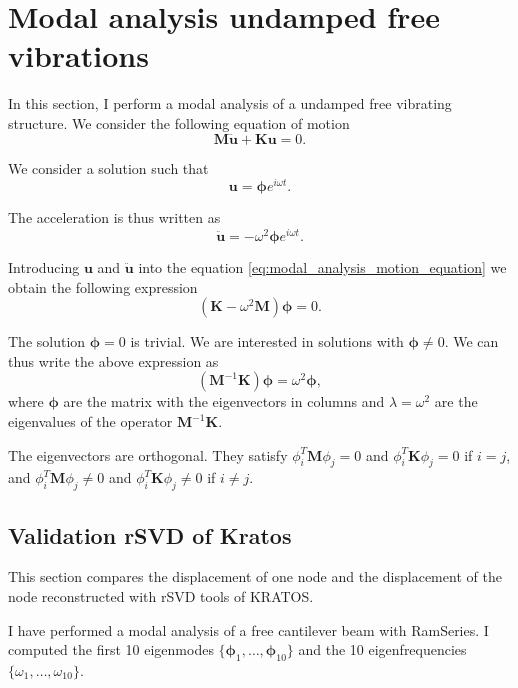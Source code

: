 \documentclass{article}
\begin{document}
\section{Modal analysis undamped free vibrations}
In this section, I perform a modal analysis of a undamped free vibrating structure. We consider the following equation of motion
\begin{equation}
  \bm{M}\bm{\ddot{u}} + \bm{K}\bm{u} = 0.
  \label{eq:modal_analysis_motion_equation}
\end{equation}

We consider a solution such that
\begin{equation}
  \bm{u} = \bm{\phi} e^{i \omega t}.
\end{equation}

The acceleration is thus written as
\begin{equation}
  \bm{\ddot{u}} = -\omega^2 \bm{\phi} e^{i \omega t}.
\end{equation}

Introducing $\bm{u}$ and $\bm{\ddot{u}}$ into the equation \ref{eq:modal_analysis_motion_equation} we obtain the following expression
\begin{equation}
  (\bm{K} - \omega^2 \bm{M}) \bm{\phi} = 0.
\end{equation}

The solution $\bm{\phi} = 0$ is trivial. We are interested in solutions with $\bm{\phi} \neq 0$. We can thus write the above expression as
\begin{equation}
  (\bm{M}^{-1}\bm{K})\bm{\phi} = \omega^2 \bm{\phi},
\end{equation}
where $\bm{\phi}$ are the matrix with the eigenvectors in columns and $\lambda = \omega^2$ are the eigenvalues of the operator $\bm{M}^{-1}\bm{K}$. \newline

The eigenvectors are orthogonal. They satisfy $\phi_i^T \bm{M} \phi_j = 0$ and $\phi_i^T \bm{K} \phi_j = 0$ if $i=j$, and $\phi_i^T \bm{M} \phi_j \neq 0$ and $\phi_i^T \bm{K} \phi_j \neq 0$ if $i \neq j$. 

\subsection*{Validation rSVD of Kratos}
This section compares the displacement of one node and the displacement of the node reconstructed with rSVD tools of KRATOS.\newline

I have performed a modal analysis of a free cantilever beam with RamSeries. I computed the first 10 eigenmodes $\{\bm{\phi}_1, \dots, \bm{\phi}_{10}\}$ and the 10 eigenfrequencies $\{ \omega_1, \dots, \omega_{10} \}$.\newline
\end{document}
